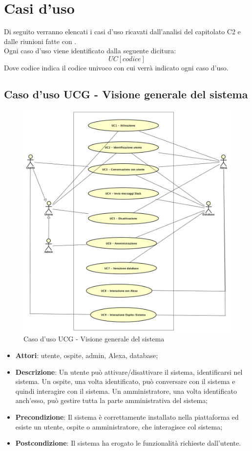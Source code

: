 \documentclass[../AnalisiDeiRequisiti.tex]{subfiles}
\begin{document}
\section{Casi d'uso}
Di seguito verranno elencati i casi d'uso ricavati dall'analisi del capitolato C2 e dalle riunioni fatte con \prop.\\
Ogni caso d'uso viene identificato dalla seguente dicitura:
\begin{equation*}
	UC[codice]
\end{equation*}
Dove codice indica il codice univoco con cui verrà indicato ogni caso d'uso.
\newpage
\subsection{Caso d'uso UCG - Visione generale del sistema}
\begin{figure}[!h]
	\centering
	\includegraphics[width=\textwidth]{UseCases/UC_AltoLivello/UC_AltoLivello.png}
	\caption{Caso d'uso UCG - Visione generale del sistema}
\end{figure}	
\begin{itemize} 
\item \textbf{Attori}: utente, ospite, admin, Alexa, database;
\item \textbf{Descrizione}: Un utente può attivare/disattivare il sistema, identificarsi nel sistema. Un ospite, una volta identificato, può conversare con il sistema e quindi interagire con il sistema. Un amministratore, una volta identificato anch'esso, può gestire tutta la parte amministrativa del sistema;
\item \textbf{Precondizione}: Il sistema è correttamente installato nella piattaforma ed esiste un utente, ospite o amministratore, che interagisce col sistema;
\item \textbf{Postcondizione}: Il sistema ha erogato le funzionalità richieste dall'utente. 
\end{itemize} 
\newpage
\end{document}
